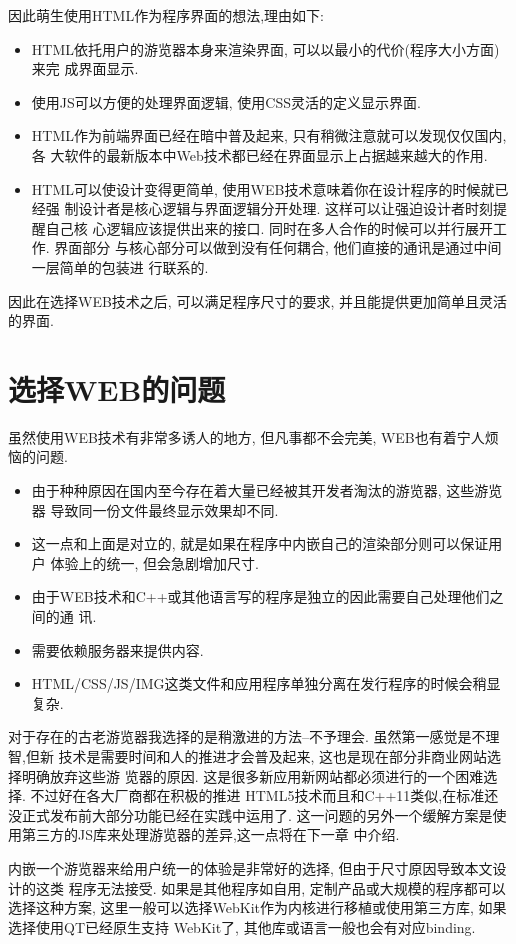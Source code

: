 因此萌生使用HTML作为程序界面的想法,理由如下:
\begin{itemize}
	\item HTML依托用户的游览器本身来渲染界面, 可以以最小的代价(程序大小方面)来完
		成界面显示. 
	\item 使用JS可以方便的处理界面逻辑, 使用CSS灵活的定义显示界面.
	\item HTML作为前端界面已经在暗中普及起来, 只有稍微注意就可以发现仅仅国内,各
		大软件的最新版本中Web技术都已经在界面显示上占据越来越大的作用. 
	\item HTML可以使设计变得更简单, 使用WEB技术意味着你在设计程序的时候就已经强
		制设计者是核心逻辑与界面逻辑分开处理. 这样可以让强迫设计者时刻提醒自己核
		心逻辑应该提供出来的接口. 同时在多人合作的时候可以并行展开工作. 界面部分
		与核心部分可以做到没有任何耦合, 他们直接的通讯是通过中间一层简单的包装进
		行联系的.
\end{itemize}
因此在选择WEB技术之后, 可以满足程序尺寸的要求, 并且能提供更加简单且灵活的界面.

\section{选择WEB的问题}

虽然使用WEB技术有非常多诱人的地方, 但凡事都不会完美, WEB也有着宁人烦恼的问题.
\begin{itemize}
	\item 由于种种原因在国内至今存在着大量已经被其开发者淘汰的游览器, 这些游览器
		导致同一份文件最终显示效果却不同.
	\item 这一点和上面是对立的, 就是如果在程序中内嵌自己的渲染部分则可以保证用户
		体验上的统一, 但会急剧增加尺寸.
	\item 由于WEB技术和C++或其他语言写的程序是独立的因此需要自己处理他们之间的通
		讯.
	\item 需要依赖服务器来提供内容.
	\item HTML/CSS/JS/IMG这类文件和应用程序单独分离在发行程序的时候会稍显复杂.
\end{itemize}

对于存在的古老游览器我选择的是稍激进的方法--不予理会. 虽然第一感觉是不理智,但新
技术是需要时间和人的推进才会普及起来, 这也是现在部分非商业网站选择明确放弃这些游
览器的原因. 
这是很多新应用新网站都必须进行的一个困难选择. 不过好在各大厂商都在积极的推进
HTML5技术而且和C++11类似,在标准还没正式发布前大部分功能已经在实践中运用了. 
这一问题的另外一个缓解方案是使用第三方的JS库来处理游览器的差异,这一点将在下一章
中介绍.

内嵌一个游览器来给用户统一的体验是非常好的选择, 但由于尺寸原因导致本文设计的这类
程序无法接受. 如果是其他程序如自用, 定制产品或大规模的程序都可以选择这种方案,
这里一般可以选择WebKit作为内核进行移植或使用第三方库, 如果选择使用QT已经原生支持
WebKit了, 其他库或语言一般也会有对应binding.

